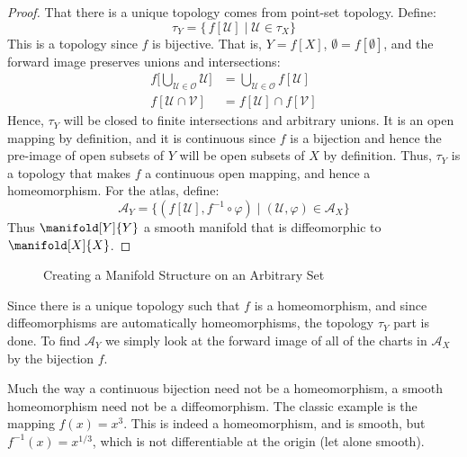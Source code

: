         \begin{proof}
            That there is a unique topology comes from point-set topology.
            Define:
            \begin{equation}
                \tau_{Y}=\{\,f[\mathcal{U}]\;|\;\mathcal{U}\in\tau_{X}\}
            \end{equation}
            This is a topology since $f$ is bijective. That is,
            $Y=f[X]$, $\emptyset=f[\emptyset]$, and the forward image
            preserves unions and intersections:
            \begin{align}
                f\Big[\bigcup_{\mathcal{U}\in\mathcal{O}}\mathcal{U}\Big]
                &=\bigcup_{\mathcal{U}\in\mathcal{O}}f[\mathcal{U}]\\
                f[\mathcal{U}\cap\mathcal{V}]
                    &=f[\mathcal{U}]\cap{f}[\mathcal{V}]
            \end{align}
            Hence, $\tau_{Y}$ will be closed to finite intersections and
            arbitrary unions. It is an open mapping by definition, and it is
            continuous since $f$ is a bijection and hence the pre-image of
            open subsets of $Y$ will be open subsets of $X$ by definition.
            Thus, $\tau_{Y}$ is a topology that makes $f$ a continuous open
            mapping, and hence a homeomorphism. For the atlas, define:
            \begin{equation}
                \mathcal{A}_{Y}=
                    \{(f[\mathcal{U}],f^{\minus{1}}\circ\varphi)
                        \;|\;(\mathcal{U},\varphi)\in\mathcal{A}_{X}\}
            \end{equation}
            Thus $\manifold[Y]{Y}$ a smooth manifold that is
            diffeomorphic to $\manifold[X]{X}$.
        \end{proof}
        \begin{figure}[H]
            \centering
            \captionsetup{type=figure}
            
            \caption{Creating a Manifold Structure on an Arbitrary Set}
            \label{fig:Manifold_Structure_on_Arbitrary_Set}
        \end{figure}
        Since there is a unique topology such that $f$ is a homeomorphism,
        and since diffeomorphisms are automatically homeomorphisms, the
        topology $\tau_{Y}$ part is done. To find $\mathcal{A}_{Y}$ we
        simply look at the forward image of all of the charts in
        $\mathcal{A}_{X}$ by the bijection $f$.
        \begin{example}
            Much the way a continuous bijection need not be a homeomorphism,
            a smooth homeomorphism need not be a diffeomorphism. The classic
            example is the mapping $f(x)=x^{3}$. This is indeed a
            homeomorphism, and is smooth, but $f^{\minus{1}}(x)=x^{1/3}$,
            which is not differentiable at the origin (let alone smooth).
        \end{example}
